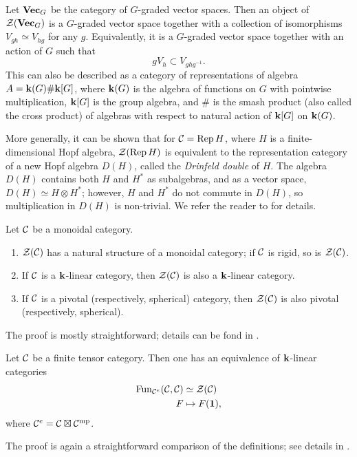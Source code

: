 \begin{example}\label{x:center-vectg}
  Let $\mathbf{Vec}_G$ be the category of $G$-graded vector spaces. Then an object
  of $\mathcal{Z}(\mathbf{Vec}_G)$ is a $G$-graded vector space together with a collection
  of isomorphisms $V_{gh}\simeq V_{hg}$ for any $g$. Equivalently, it is a
  $G$-graded vector space together with an action of $G$ such that
  $$
   gV_h\subset V_{ghg^{-1}}.
  $$
  This can also be described as a category of representations of algebra
  $A=\mathbf{k}(G)\# \mathbf{k}[G]$, where $\mathbf{k}(G)$ is the algebra of functions on $G$
  with pointwise multiplication, $\mathbf{k}[G]$ is the group algebra, and $\#$ is
  the smash product (also called the cross product) of algebras with
  respect to natural action of $\mathbf{k}[G]$ on $\mathbf{k}(G)$.
\end{example}
More generally, it can be shown that for $\mathcal{C}=\operatorname{Rep} H$, where $H$ is a
finite-dimensional Hopf algebra, $\mathcal{Z}(\operatorname{Rep} H)$ is equivalent to the
representation category of a new Hopf algebra $D(H)$, called the \emph{Drinfeld
double} of $H$. The algebra $D(H)$ contains both $H$ and
$H^*$ as subalgebras, and as a vector space, $D(H)\simeq H\otimes H^*$; however,
$H$ and $H^*$ do not commute in $D(H)$, so multiplication in $D(H)$ is
non-trivial. We refer the reader to \cite[Section 7.14]{etingof-fusion} for
details.

\begin{lemma}\label{l:drinfeld-monoidal}
  Let $\mathcal{C}$ be a monoidal category.
  \begin{enumerate}
    \item $\mathcal{Z}(\mathcal{C})$ has a natural structure of a monoidal category; if
      $\mathcal{C}$ is rigid, so is $\mathcal{Z}(\mathcal{C})$.
    \item If $\mathcal{C}$ is a $\mathbf{k}$-linear category, then $\mathcal{Z}(\mathcal{C})$ is also
      a $\mathbf{k}$-linear category.
    \item If $\mathcal{C}$ is a pivotal \textup{(}respectively, spherical\textup{)} category, then
      $\mathcal{Z}(\mathcal{C})$ is also pivotal \textup{(}respectively, spherical\textup{)}.
  \end{enumerate}
\end{lemma}
The proof is mostly straightforward; details can be fond in
\cite[Section 7.13]{etingof-fusion}.

\begin{lemma}\label{l:dr-center-2}
  Let $\mathcal{C}$ be a finite tensor category. Then one has an equivalence of
  $\mathbf{k}$-linear categories
  \begin{align*}
    \operatorname{Fun}_{\mathcal{C}^e}(\mathcal{C}, \mathcal{C})&\simeq \mathcal{Z}(\mathcal{C})\\
                              F&\mapsto F(\mathbf{1}),
  \end{align*}
  where $\mathcal{C}^e=\mathcal{C}\boxtimes\mathcal{C}^{{\mathrm{mp}}}$.
\end{lemma}
The proof is again a straightforward comparison of the definitions; see details
in  \cite[Proposition 7.13.8]{etingof-fusion}.


